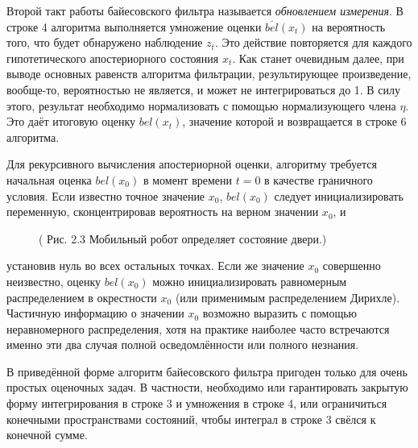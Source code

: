 \documentclass[10pt,a4paper]{article}
\begin{document}
 Второй такт работы байесовского фильтра называется \textit{обновлением измерения}. В строке 4 алгоритма выполняется умножение оценки $\overline{bel}(x_t)$ на вероятность того, что будет обнаружено наблюдение $z_t$. Это действие повторяется для каждого гипотетического апостериорного состояния $x_t$. Как станет очевидным далее, при выводе основных равенств алгоритма фильтрации, результирующее произведение, вообще-то, вероятностью не является, и может не интегрироваться до 1. В силу этого, результат необходимо нормализовать с помощью нормализующего члена $\eta$. Это даёт итоговую оценку $bel(x_t)$, значение которой и возвращается в строке 6 алгоритма.
 
 Для рекурсивного вычисления апостериорной оценки, алгоритму требуется начальная оценка $bel(x_0)$ в момент времени $t = 0$ в качестве граничного условия. Если известно точное значение $x_0$, $bel(x_0)$ следует инициализировать переменную, сконцентрировав вероятность на верном значении $x_0$, и\\
 
 \begin{figure}[h]
 	\caption{ (  Рис. 2.3 Мобильный робот определяет состояние двери.)}
 	\label{fig:23orig}
 \end{figure}
 установив нуль во всех остальных точках. Если же значение $x_0$ совершенно неизвестно, оценку $bel(x_0)$ можно инициализировать равномерным распределением в окрестности $x_0$ (или применимым распределением Дирихле). Частичную информацию о значении $x_0$ возможно выразить с помощью неравномерного распределения, хотя на практике наиболее часто встречаются именно эти два случая полной осведомлённости или полного незнания.
  
 В приведённой форме алгоритм байесовского фильтра пригоден только для очень простых оценочных задач. В частности, необходимо или гарантировать закрытую форму интегрирования в строке 3 и умножения в строке 4, или ограничиться конечными пространствами состояний, чтобы интеграл в строке 3 свёлся к конечной сумме.\\ 
 
\end{document}
